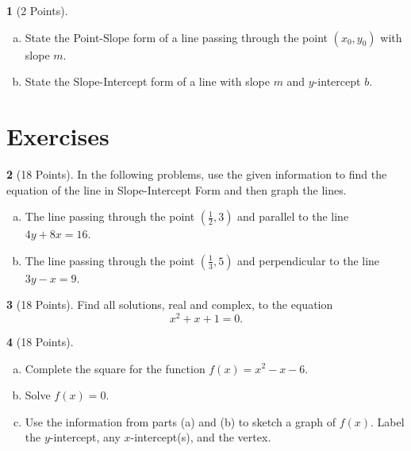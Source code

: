 \documentclass[12pt]{amsart}
\theoremstyle{definition}
\newtheorem{thm}{}
\theoremstyle{definition}
\begin{document}
\begin{thm}[2 Points]\label{ex1}
  \begin{enumerate}[(a)]
  \item
    State the Point-Slope form of a line passing through the point $(x_0, y_0)$ with slope $m$.
    \vspace{1in}
  \item
    State the Slope-Intercept form of a line with slope $m$ and $y$-intercept $b$.
  \end{enumerate}
\end{thm}
\newpage
\section{Exercises}

\begin{thm}[18 Points]\label{ex5}
  In the following problems, use the given information to find the equation of the line in Slope-Intercept Form and then graph the lines.
  \begin{enumerate}[(a)]
  \item
    The line passing through the point $\left(\frac{1}{2}, 3\right)$ and parallel to the line $4y + 8x = 16$.
    \vspace{3in}
  \item
    The line passing through the  point $\left(\frac{1}{3},5\right)$ and perpendicular to the line $3y - x = 9$.
    \vspace{2in}
  \end{enumerate}
  \vspace{1in}
\end{thm}

\newpage
\begin{thm}[18 Points]\label{ex9}
  Find all solutions, real and complex, to the equation
  $$x^2 + x + 1 = 0.$$
  \vspace{2in}
\end{thm}

\begin{thm}[18 Points]\label{ex10}
  \begin{enumerate}[(a)]
  \item
    Complete the square for the function $f(x) = x^2 - x - 6$.
    \vspace{1in}
  \item
    Solve $f(x) = 0$.
    \vspace{1in}
  \item
    Use the information from parts (a) and (b) to sketch a graph of $f(x)$.
    Label the $y$-intercept, any $x$-intercept(s), and the vertex.
    \vspace{2in}
  \end{enumerate}
\end{thm}
\end{document}
